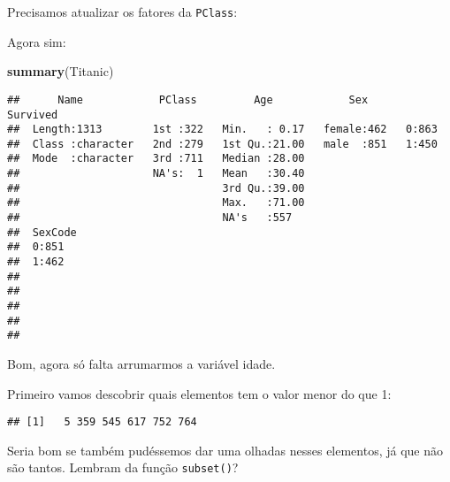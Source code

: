 \documentclass[]{book}
\newenvironment{Shaded}{\begin{snugshade}}{\end{snugshade}}
\newcommand{\DecValTok}[1]{\textcolor[rgb]{0.00,0.00,0.81}{#1}}
\newcommand{\KeywordTok}[1]{\textcolor[rgb]{0.13,0.29,0.53}{\textbf{#1}}}
\newcommand{\NormalTok}[1]{#1}
\newcommand{\OperatorTok}[1]{\textcolor[rgb]{0.81,0.36,0.00}{\textbf{#1}}}
\newcommand{\StringTok}[1]{\textcolor[rgb]{0.31,0.60,0.02}{#1}}
\theoremstyle{definition}
\theoremstyle{definition}
\theoremstyle{definition}
\theoremstyle{remark}
\begin{document}
Precisamos atualizar os fatores da \texttt{PClass}:

\begin{Shaded}
\end{Shaded}

Agora sim:

\begin{Shaded}
\begin{Highlighting}[]
\KeywordTok{summary}\NormalTok{(Titanic)}
\end{Highlighting}
\end{Shaded}

\begin{verbatim}
##      Name            PClass         Age            Sex      Survived
##  Length:1313        1st :322   Min.   : 0.17   female:462   0:863   
##  Class :character   2nd :279   1st Qu.:21.00   male  :851   1:450   
##  Mode  :character   3rd :711   Median :28.00                        
##                     NA's:  1   Mean   :30.40                        
##                                3rd Qu.:39.00                        
##                                Max.   :71.00                        
##                                NA's   :557                          
##  SexCode
##  0:851  
##  1:462  
##         
##         
##         
##         
## 
\end{verbatim}

Bom, agora só falta arrumarmos a variável idade.

Primeiro vamos descobrir quais elementos tem o valor menor do que 1:

\begin{Shaded}
\end{Shaded}

\begin{verbatim}
## [1]   5 359 545 617 752 764
\end{verbatim}

Seria bom se também pudéssemos dar uma olhadas nesses elementos, já que não são tantos. Lembram da função \texttt{subset()}?
\end{document}
